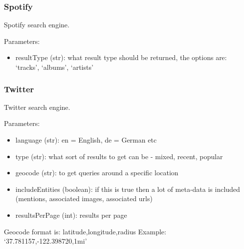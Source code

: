 \documentclass[letterpaper,10pt,english]{sphinxmanual}
\begin{document}
\subsubsection{Spotify}
\label{api2.0:spotify}

\begin{fulllineitems}
\label{api2.0:puppy.search.engine.Spotify}
Spotify search engine.

Parameters:
\begin{itemize}
\item {} 
resultType (str):  what result type should be returned, the options are: `tracks', `albums', `artists'

\end{itemize}

\end{fulllineitems}



\subsubsection{Twitter}
\label{api2.0:twitter}

\begin{fulllineitems}
\label{api2.0:puppy.search.engine.Twitter}
Twitter search engine.

Parameters:
\begin{itemize}
\item {} 
language (str): en = English, de = German etc

\item {} 
type (str): what sort of results to get can be - mixed, recent, popular

\item {} 
geocode (str): to get queries around a specific location

\item {} 
includeEntities (boolean): if this is true then a lot of meta-data is included (mentions, associated images, associated urls)

\item {} 
resultsPerPage (int): results per page

\end{itemize}

Geocode format is: latitude,longitude,radius
Example: `37.781157,-122.398720,1mi'

\end{fulllineitems}
\end{document}
